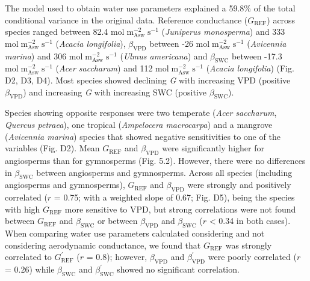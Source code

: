 \documentclass[11pt,twoside]{reedthesis}
\begin{document}
The model used to obtain water use parameters explained a 59.8\% of the
total conditional variance in the original data. Reference conductance
(\(G_{\text{REF}}\)) across species ranged between 82.4
\(\text{mol}\; \text{m}_{\text{Asw}}^{-2}\; \text{s}^{-1}\)
(\emph{Juniperus monosperma}) and 333
\(\text{mol}\; \text{m}_{\text{Asw}}^{-2}\; \text{s}^{-1}\)
(\emph{Acacia longifolia}), \(\beta_{\text{VPD}}\) between -26
\(\text{mol}\; \text{m}_{\text{Asw}}^{-2}\; \text{s}^{-1}\)
(\emph{Avicennia marina}) and 306
\(\text{mol}\; \text{m}_{\text{Asw}}^{-2}\; \text{s}^{-1}\) (\emph{Ulmus
americana}) and \(\beta_{\text{SWC}}\) between -17.3
\(\text{mol}\; \text{m}_{\text{Asw}}^{-2}\; \text{s}^{-1}\) (\emph{Acer
saccharum}) and 112
\(\text{mol}\; \text{m}_{\text{Asw}}^{-2}\; \text{s}^{-1}\)
(\emph{Acacia longifolia}) (Fig. D2, D3, D4). Most species showed
declining \emph{G} with increasing VPD (positive \(\beta_{\text{VPD}}\))
and increasing \emph{G} with increasing SWC (positive
\(\beta_{\text{SWC}}\)).\par

Species showing opposite responses were two temperate (\emph{Acer
saccharum}, \emph{Quercus petraea}), one tropical (\emph{Ampelocera
macrocarpa}) and a mangrove (\emph{Avicennia marina}) species that
showed negative sensitivities to one of the variables (Fig. D2). Mean
\(G_{\text{REF}}\) and \(\beta_{\text{VPD}}\) were significantly higher
for angiosperms than for gymnosperms (Fig. 5.2). However, there were no
differences in \(\beta_{\text{SWC}}\) between angiosperms and
gymnosperms. Across all species (including angiosperms and gymnosperms),
\(G_{\text{REF}}\) and \(\beta_{\text{VPD}}\) were strongly and
positively correlated (\(r\) = 0.75; with a weighted slope of 0.67; Fig.
D5), being the species with high \(G_{\text{REF}}\) more sensitive to
VPD, but strong correlations were not found between \(G_{\text{REF}}\)
and \(\beta_{\text{SWC}}\) or between \(\beta_{\text{VPD}}\) and
\(\beta_{\text{SWC}}\) (\textbar{}\(r\)\textbar{} \textless{} 0.34 in
both cases). When comparing water use parameters calculated considering
and not considering aerodynamic conductance, we found that
\(G_{\text{REF}}\) was strongly correlated to \(G_{\text{REF}}^{'}\)
(\(r\) = 0.8); however, \(\beta_{\text{VPD}}\) and
\(\beta_{\text{VPD}}^{'}\) were poorly correlated (\(r\) = 0.26) while
\(\beta_{\text{SWC}}\) and \(\beta_{\text{SWC}}^{'}\) showed no
significant correlation.\par
\end{document}
